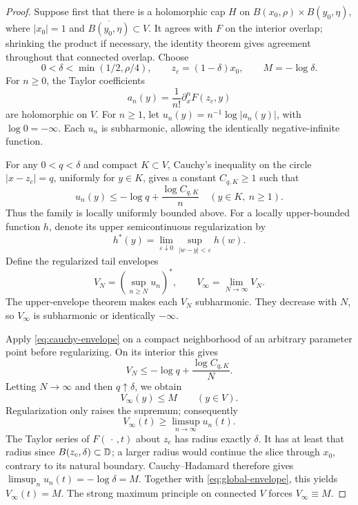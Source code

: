\begin{proof}
Suppose first that there is a holomorphic cap \(H\) on
\(B(x_0,\rho)\times B(y_0,\eta)\), where \(|x_0|=1\) and
\(\overline{B(y_0,\eta)}\subset V\). It agrees with \(F\) on the
interior overlap; shrinking the product if necessary, the identity
theorem gives agreement throughout that connected overlap.
Choose
\[
0<\delta<\min(1/2,\rho/4),\qquad
z_c=(1-\delta)x_0,\qquad M=-\log\delta.
\]
For \(n\geq0\), the Taylor coefficients
\[
a_n(y)=\frac1{n!}\partial_x^nF(z_c,y)
\]
are holomorphic on \(V\).
For \(n\geq1\), let \(u_n(y)=n^{-1}\log|a_n(y)|\), with
\(\log0=-\infty\). Each \(u_n\) is subharmonic, allowing the
identically negative-infinite function.

For any \(0<q<\delta\) and compact \(K\subset V\), Cauchy's
inequality on the circle \(|x-z_c|=q\), uniformly for \(y\in K\),
gives a constant \(C_{q,K}\geq1\) such that
\begin{equation}\label{eq:cauchy-envelope}
u_n(y)\leq-\log q+\frac{\log C_{q,K}}n
\quad(y\in K,\ n\geq1).
\end{equation}
Thus the family is locally uniformly bounded above.
For a locally upper-bounded function \(h\), denote its upper
semicontinuous regularization by
\[
h^*(y)=\lim_{\varepsilon\downarrow0}
\sup_{|w-y|<\varepsilon}h(w).
\]
Define the regularized tail envelopes
\begin{equation}\label{eq:tail-envelopes}
V_N=\left(\sup_{n\geq N}u_n\right)^*,
\qquad V_\infty=\lim_{N\to\infty}V_N.
\end{equation}
The upper-envelope theorem makes each \(V_N\) subharmonic.
They decrease with \(N\), so \(V_\infty\) is subharmonic or
identically \(-\infty\).

Apply \eqref{eq:cauchy-envelope} on a compact neighborhood of an
arbitrary parameter point before regularizing. On its interior this
gives
\[
V_N\leq-\log q+\frac{\log C_{q,K}}N.
\]
Letting \(N\to\infty\) and then \(q\uparrow\delta\), we obtain
\begin{equation}\label{eq:global-envelope}
V_\infty(y)\leq M\qquad(y\in V).
\end{equation}
Regularization only raises the supremum; consequently
\[
V_\infty(t)\geq\limsup_{n\to\infty}u_n(t).
\]
The Taylor series of \(F(\,\cdot\,,t)\) about \(z_c\) has radius
exactly \(\delta\). It has at least that radius since
\(B(z_c,\delta)\subset\mathbb D\); a larger radius would continue the
slice through \(x_0\), contrary to its natural boundary.
Cauchy--Hadamard therefore gives
\(\limsup_nu_n(t)=-\log\delta=M\).
Together with \eqref{eq:global-envelope}, this yields
\(V_\infty(t)=M\). The strong maximum principle on connected \(V\)
forces \(V_\infty\equiv M\).


\end{proof}
